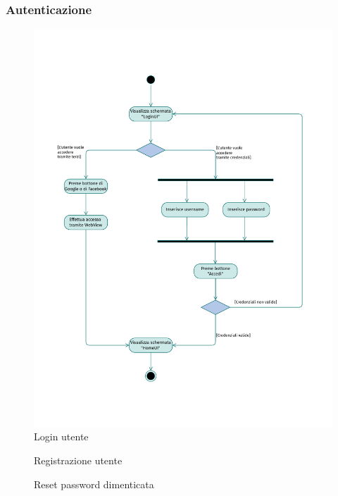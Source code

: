\documentclass{natourDoc}
\begin{document}
\subsubsection{Autenticazione}
\begin{figure}[!htbp]
	\centering
	\includegraphics[width=\textwidth, page=1]{./diagrams/activity.pdf}
	\caption{Login utente}
\end{figure}
\FloatBarrier

\newpage
\begin{figure}[!htbp]
	\centering
	
	\caption{Registrazione utente}
\end{figure}
\FloatBarrier

\newpage
\begin{figure}[!htbp]
	\centering
	
	\caption{Reset password dimenticata}
\end{figure}
\FloatBarrier
\end{document}
